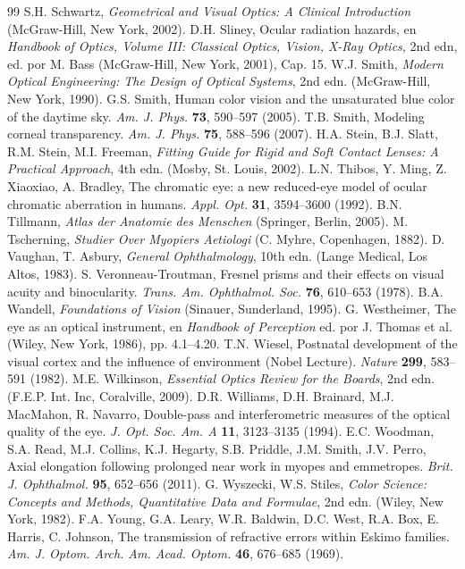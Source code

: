 \documentclass[12pt]{book}
\begin{document}
\begin{thebibliography}{99}
 S.H. Schwartz, \textit{Geometrical and Visual Optics: A Clinical Introduction} (McGraw-Hill, New York, 2002).
 D.H. Sliney, Ocular radiation hazards, en \textit{Handbook of Optics, Volume III: Classical Optics, Vision, X-Ray Optics}, 2nd edn, ed. por M. Bass (McGraw-Hill, New York, 2001), Cap. 15.
 W.J. Smith, \textit{Modern Optical Engineering: The Design of Optical Systems}, 2nd edn. (McGraw-Hill, New York, 1990).
 G.S. Smith, Human color vision and the unsaturated blue color of the daytime sky. \textit{Am. J. Phys.} \textbf{73}, 590--597 (2005).
 T.B. Smith, Modeling corneal transparency. \textit{Am. J. Phys.} \textbf{75}, 588--596 (2007).
 H.A. Stein, B.J. Slatt, R.M. Stein, M.I. Freeman, \textit{Fitting Guide for Rigid and Soft Contact Lenses: A Practical Approach}, 4th edn. (Mosby, St. Louis, 2002).
 L.N. Thibos, Y. Ming, Z. Xiaoxiao, A. Bradley, The chromatic eye: a new reduced-eye model of ocular chromatic aberration in humans. \textit{Appl. Opt.} \textbf{31}, 3594--3600 (1992).
 B.N. Tillmann, \textit{Atlas der Anatomie des Menschen} (Springer, Berlin, 2005).
 M. Tscherning, \textit{Studier Over Myopiers Aetiologi} (C. Myhre, Copenhagen, 1882).
 D. Vaughan, T. Asbury, \textit{General Ophthalmology}, 10th edn. (Lange Medical, Los Altos, 1983).
 S. Veronneau-Troutman, Fresnel prisms and their effects on visual acuity and binocularity. \textit{Trans. Am. Ophthalmol. Soc.} \textbf{76}, 610--653 (1978).
 B.A. Wandell, \textit{Foundations of Vision} (Sinauer, Sunderland, 1995).
 G. Westheimer, The eye as an optical instrument, en \textit{Handbook of Perception} ed. por J. Thomas et al. (Wiley, New York, 1986), pp. 4.1--4.20.
 T.N. Wiesel, Postnatal development of the visual cortex and the influence of environment (Nobel Lecture). \textit{Nature} \textbf{299}, 583--591 (1982).
 M.E. Wilkinson, \textit{Essential Optics Review for the Boards}, 2nd edn. (F.E.P. Int. Inc, Coralville, 2009).
 D.R. Williams, D.H. Brainard, M.J. MacMahon, R. Navarro, Double-pass and interferometric measures of the optical quality of the eye. \textit{J. Opt. Soc. Am. A} \textbf{11}, 3123--3135 (1994).
 E.C. Woodman, S.A. Read, M.J. Collins, K.J. Hegarty, S.B. Priddle, J.M. Smith, J.V. Perro, Axial elongation following prolonged near work in myopes and emmetropes. \textit{Brit. J. Ophthalmol.} \textbf{95}, 652--656 (2011).
 G. Wyszecki, W.S. Stiles, \textit{Color Science: Concepts and Methods, Quantitative Data and Formulae}, 2nd edn. (Wiley, New York, 1982).
 F.A. Young, G.A. Leary, W.R. Baldwin, D.C. West, R.A. Box, E. Harris, C. Johnson, The transmission of refractive errors within Eskimo families. \textit{Am. J. Optom. Arch. Am. Acad. Optom.} \textbf{46}, 676--685 (1969).
\end{thebibliography}

\end{document}
